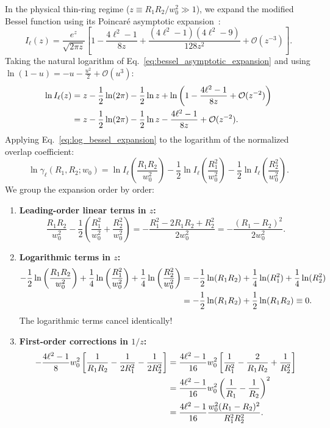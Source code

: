\documentclass{optica-article}
\begin{document}
In the physical thin-ring regime ($z \equiv R_1 R_2 / w_0^2 \gg 1$), we expand the modified Bessel function using its Poincaré asymptotic expansion~\cite{Gradshteyn2014}:
\begin{equation}
I_\ell(z) = \frac{e^z}{\sqrt{2\pi z}} \left[ 1 - \frac{4\ell^2 - 1}{8z} + \frac{(4\ell^2 - 1)(4\ell^2 - 9)}{128 z^2} + \mathcal{O}(z^{-3}) \right].
\label{eq:bessel_asymptotic_expansion}
\end{equation}
Taking the natural logarithm of Eq.~\eqref{eq:bessel_asymptotic_expansion} and using $\ln(1 - u) = -u - \frac{u^2}{2} + \mathcal{O}(u^3)$:
\begin{align}
\ln I_\ell(z) &= z - \frac{1}{2}\ln(2\pi) - \frac{1}{2}\ln z + \ln\left( 1 - \frac{4\ell^2 - 1}{8z} + \mathcal{O}(z^{-2}) \right) \notag \\
&= z - \frac{1}{2}\ln(2\pi) - \frac{1}{2}\ln z - \frac{4\ell^2 - 1}{8z} + \mathcal{O}(z^{-2}).
\label{eq:log_bessel_expansion}
\end{align}
Applying Eq.~\eqref{eq:log_bessel_expansion} to the logarithm of the normalized overlap coefficient:
\begin{equation}
\ln \gamma_\ell(R_1, R_2; w_0) = \ln I_\ell\left( \frac{R_1 R_2}{w_0^2} \right) - \frac{1}{2} \ln I_\ell\left( \frac{R_1^2}{w_0^2} \right) - \frac{1}{2} \ln I_\ell\left( \frac{R_2^2}{w_0^2} \right).
\label{eq:log_gamma_expansion}
\end{equation}
We group the expansion order by order:
\begin{enumerate}
    \item \textbf{Leading-order linear terms in $z$:}
    \begin{equation}
    \frac{R_1 R_2}{w_0^2} - \frac{1}{2} \left( \frac{R_1^2}{w_0^2} + \frac{R_2^2}{w_0^2} \right) = - \frac{R_1^2 - 2 R_1 R_2 + R_2^2}{2 w_0^2} = - \frac{(R_1 - R_2)^2}{2 w_0^2}.
    \label{eq:linear_cancellation}
    \end{equation}
    \item \textbf{Logarithmic terms in $z$:}
    \begin{align}
    - \frac{1}{2} \ln\left( \frac{R_1 R_2}{w_0^2} \right) + \frac{1}{4} \ln\left( \frac{R_1^2}{w_0^2} \right) + \frac{1}{4} \ln\left( \frac{R_2^2}{w_0^2} \right) &= - \frac{1}{2} \ln(R_1 R_2) + \frac{1}{4} \ln(R_1^2) + \frac{1}{4} \ln(R_2^2) \notag \\
    &= - \frac{1}{2} \ln(R_1 R_2) + \frac{1}{2} \ln(R_1 R_2) \equiv 0.
    \label{eq:log_cancellation}
    \end{align}
    The logarithmic terms cancel identically!
    \item \textbf{First-order corrections in $1/z$:}
    \begin{align}
    - \frac{4\ell^2 - 1}{8} w_0^2 \left[ \frac{1}{R_1 R_2} - \frac{1}{2 R_1^2} - \frac{1}{2 R_2^2} \right] &= \frac{4\ell^2 - 1}{16} w_0^2 \left[ \frac{1}{R_1^2} - \frac{2}{R_1 R_2} + \frac{1}{R_2^2} \right] \notag \\
    &= \frac{4\ell^2 - 1}{16} w_0^2 \left( \frac{1}{R_1} - \frac{1}{R_2} \right)^2 \notag \\
    &= \frac{4\ell^2 - 1}{16} \frac{w_0^2 (R_1 - R_2)^2}{R_1^2 R_2^2}.
    \label{eq:correction_algebra}
    \end{align}
\end{enumerate}
\end{document}
